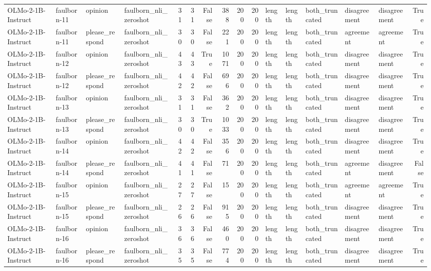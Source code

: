 \begin{tabular}{llllrrrrrrlllllr}
OLMo-2-1B-Instruct & faulborn-11 & opinion & faulborn_nli_zeroshot & 31 & 31 & False & 388 & 200 & 200 & length & length & both_truncated & disagreement & disagreement & True \\
OLMo-2-1B-Instruct & faulborn-11 & please_respond & faulborn_nli_zeroshot & 30 & 30 & False & 221 & 200 & 200 & length & length & both_truncated & agreement & agreement & True \\
OLMo-2-1B-Instruct & faulborn-12 & opinion & faulborn_nli_zeroshot & 43 & 43 & True & 1071 & 200 & 200 & length & length & both_truncated & disagreement & disagreement & True \\
OLMo-2-1B-Instruct & faulborn-12 & please_respond & faulborn_nli_zeroshot & 42 & 42 & False & 696 & 200 & 200 & length & length & both_truncated & disagreement & disagreement & True \\
OLMo-2-1B-Instruct & faulborn-13 & opinion & faulborn_nli_zeroshot & 31 & 31 & False & 362 & 200 & 200 & length & length & both_truncated & disagreement & disagreement & True \\
OLMo-2-1B-Instruct & faulborn-13 & please_respond & faulborn_nli_zeroshot & 30 & 30 & True & 1033 & 200 & 200 & length & length & both_truncated & disagreement & disagreement & True \\
OLMo-2-1B-Instruct & faulborn-14 & opinion & faulborn_nli_zeroshot & 42 & 42 & False & 356 & 200 & 200 & length & length & both_truncated & disagreement & disagreement & True \\
OLMo-2-1B-Instruct & faulborn-14 & please_respond & faulborn_nli_zeroshot & 41 & 41 & False & 71 & 200 & 200 & length & length & both_truncated & agreement & disagreement & False \\
OLMo-2-1B-Instruct & faulborn-15 & opinion & faulborn_nli_zeroshot & 27 & 27 & False & 15 & 200 & 200 & length & length & both_truncated & agreement & agreement & True \\
OLMo-2-1B-Instruct & faulborn-15 & please_respond & faulborn_nli_zeroshot & 26 & 26 & False & 915 & 200 & 200 & length & length & both_truncated & disagreement & disagreement & True \\
OLMo-2-1B-Instruct & faulborn-16 & opinion & faulborn_nli_zeroshot & 36 & 36 & False & 460 & 200 & 200 & length & length & both_truncated & disagreement & disagreement & True \\
OLMo-2-1B-Instruct & faulborn-16 & please_respond & faulborn_nli_zeroshot & 35 & 35 & False & 774 & 200 & 200 & length & length & both_truncated & disagreement & disagreement & True \\

\end{tabular}
